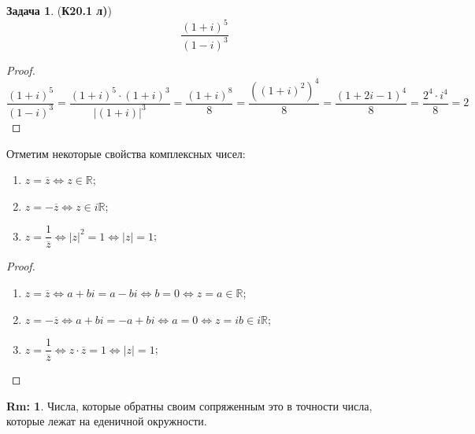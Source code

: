 \documentclass[12pt]{article}
\newcommand{\MR}{\mathbb{R}}
\theoremstyle{definition}
\newtheorem{rem}{Rm:}
\newtheorem{problem}{Задача}
\begin{document}
\begin{problem}(\textbf{К20.1 л)}) 
	$$
		\dfrac{(1 + i)^5}{(1-i)^3}
	$$
\end{problem}
\begin{proof}
	$$
		\dfrac{(1 + i)^5}{(1-i)^3} = \dfrac{(1+i)^5{\cdot}(1+i)^3}{|(1+i)|^3} = \dfrac{(1+i)^8}{8} = \dfrac{((1+i)^2)^4}{8} = \dfrac{(1 +2i -1)^4}{8} = \dfrac{2^4 {\cdot}i^4}{8} = 2
	$$	
\end{proof}
Отметим некоторые свойства комплексных чисел:
\begin{enumerate}[label=\arabic*)]
	\item $z = \overline{z} \Leftrightarrow z \in \MR$;
	\item $z = - \overline{z} \Leftrightarrow z \in i\MR$;
	\item $z = \dfrac{1}{\overline{z}} \Leftrightarrow |z|^2 = 1 \Leftrightarrow |z| = 1$;
\end{enumerate}
\begin{proof}\hfill
	\begin{enumerate}[label=\arabic*)]
		\item $z = \overline{z} \Leftrightarrow a + bi = a- bi \Leftrightarrow b = 0 \Leftrightarrow z = a \in \MR$;
		\item $z = -\overline{z} \Leftrightarrow a + bi = -a +bi \Leftrightarrow a = 0 \Leftrightarrow z = ib \in i\MR$;
		\item $z = \dfrac{1}{\overline{z}} \Leftrightarrow z{\cdot}\overline{z} = 1 \Leftrightarrow |z| = 1$;
	\end{enumerate}
\end{proof}
\begin{rem}
	Числа, которые обратны своим сопряженным это в точности числа, которые лежат на еденичной окружности.
\end{rem}
\end{document}
